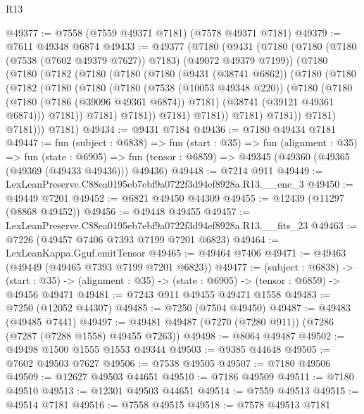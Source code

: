 \begin{lexlean}{R13}
\begin{coremodule}
@49377 := @7558 (@7559 @49371 @7181) (@7578 @49371 @7181)
@49379 := @7611 @49348 @6874
@49433 := @49377
    (@7180
      (@9431
        (@7180
          (@7180 (@7180 (@7538 (@7602 @49379 @7627)) @7183) (@49072 @49379 @7199))
          (@7180
            (@7180
              (@7182
                (@7180
                  (@7180
                    (@7180
                      (@9431 (@38741 @6862))
                      (@7180
                        (@7180
                          (@7182
                            (@7180
                              (@7180
                                (@7180
                                  (@7538 (@10053 @49348 @220))
                                  (@7180
                                    (@7180
                                      (@7180 (@7186 (@39096 @49361 @6874)) @7181)
                                      (@38741 (@39121 @49361 @6874)))
                                    @7181))
                                @7181)
                              @7181))
                          @7181)
                        @7181))
                    @7181)
                  @7181))
              @7181)
            @7181)))
      @7181)
@49434 := @9431 @7184
@49436 := @7180 @49434 @7181
@49447 := fun (subject : @6838) =>
  fun (start : @35) =>
  fun (alignment : @35) =>
  fun (state : @6905) =>
  fun (tensor : @6859) => @49345 (@49360 (@49365 (@49369 (@49433 @49436))) @49436)
@49448 := @7214 @911
@49449 := LexLeanPreserve.C88ea0195eb7ebf9a0722f3d94ef8928a.R13.__enc_3
@49450 := @49449 @7201
@49452 := @6821 @49450 @44309
@49455 := @12439 (@11297 (@8868 @49452))
@49456 := @49448 @49455
@49457 := LexLeanPreserve.C88ea0195eb7ebf9a0722f3d94ef8928a.R13.__fits_23
@49463 := @7226 (@49457 @7406 @7393 @7199 @7201 @6823)
@49464 := LexLeanKappa.Gguf.emitTensor
@49465 := @49464 @7406
@49471 := @49463 (@49449 (@49465 @7393 @7199 @7201 @6823))
@49477 := (subject : @6838) ->
  (start : @35) -> (alignment : @35) -> (state : @6905) -> (tensor : @6859) -> @49456 @49471
@49481 := @7243 @911 @49455 @49471 @1558
@49483 := @7250 (@12052 @44307)
@49485 := @7250 (@7504 @49450)
@49487 := @49483 (@49485 @7441)
@49497 := @49481 @49487 (@7270 (@7280 @911)) (@7286 (@7287 (@7288 @1558) @49455 @7263))
@49498 := @8064 @49487
@49502 := @49498 @1500 @1555 @1553 @49344
@49503 := @9385 @44648
@49505 := @7602 @49503 @7627
@49506 := @7538 @49505
@49507 := @7180 @49506
@49509 := @12627 @49503 @44651
@49510 := @7186 @49509
@49511 := @7180 @49510
@49513 := @12301 @49503 @44651
@49514 := @7559 @49513
@49515 := @49514 @7181
@49516 := @7558 @49515
@49518 := @7578 @49513 @7181

\end{coremodule}
\end{lexlean}
